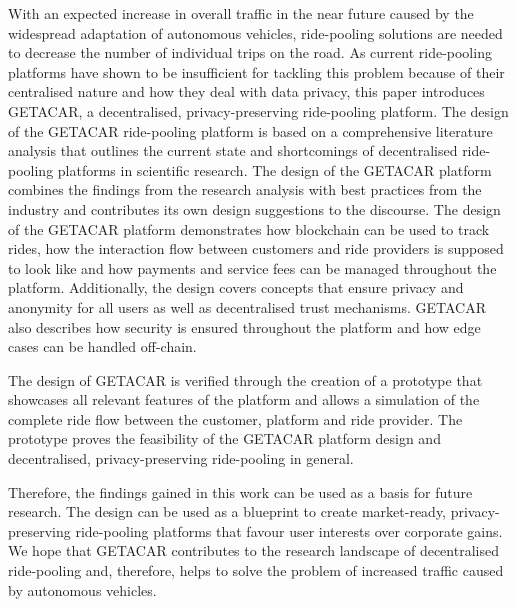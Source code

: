 With an expected increase in overall traffic in the near future caused by the widespread adaptation of autonomous vehicles, ride-pooling solutions are needed to decrease the number of individual trips on the road. As current ride-pooling platforms have shown to be insufficient for tackling this problem because of their centralised nature and how they deal with data privacy, this paper introduces GETACAR, a decentralised, privacy-preserving ride-pooling platform. The design of the GETACAR ride-pooling platform is based on a comprehensive literature analysis that outlines the current state and shortcomings of decentralised ride-pooling platforms in scientific research. The design of the GETACAR platform combines the findings from the research analysis with best practices from the industry and contributes its own design suggestions to the discourse. The design of the GETACAR platform demonstrates how blockchain can be used to track rides,  how the interaction flow between customers and ride providers is supposed to look like and how payments and service fees can be managed throughout the platform. Additionally, the design covers concepts that ensure privacy and anonymity for all users as well as decentralised trust mechanisms. GETACAR also describes how security is ensured throughout the platform and how edge cases can be handled off-chain. 

The design of GETACAR is verified through the creation of a prototype that showcases all relevant features of the platform and allows a simulation of the complete ride flow between the customer, platform and ride provider. The prototype proves the feasibility of the GETACAR platform design and decentralised, privacy-preserving ride-pooling in general. 

Therefore, the findings gained in this work can be used as a basis for future research. The design can be used as a blueprint to create market-ready,  privacy-preserving ride-pooling platforms that favour user interests over corporate gains. We hope that GETACAR contributes to the research landscape of decentralised ride-pooling and, therefore, helps to solve the problem of increased traffic caused by autonomous vehicles.